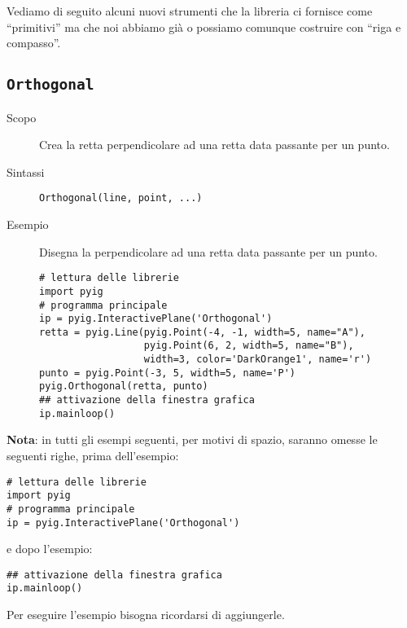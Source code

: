 

Vediamo di seguito alcuni nuovi strumenti che la libreria ci fornisce come 
``primitivi'' ma che noi abbiamo già o possiamo comunque costruire con 
``riga e compasso''.

\subsection{\lstinline{Orthogonal}}
\label{sub:geoint_orthogonal}

\begin{description}
 \item [Scopo] Crea la retta perpendicolare ad una retta data passante per un 
punto.
 \item [Sintassi] \lstinline{Orthogonal(line, point, ...)}
% 
% 

 \item [Esempio] Disegna la perpendicolare ad una retta data passante per un 
punto.

\begin{lstlisting}
# lettura delle librerie 
import pyig
# programma principale
ip = pyig.InteractivePlane('Orthogonal')
retta = pyig.Line(pyig.Point(-4, -1, width=5, name="A"), 
                  pyig.Point(6, 2, width=5, name="B"), 
                  width=3, color='DarkOrange1', name='r')
punto = pyig.Point(-3, 5, width=5, name='P')
pyig.Orthogonal(retta, punto)
## attivazione della finestra grafica
ip.mainloop()
\end{lstlisting}

\end{description}

\begin{exrig}
 
\textbf{Nota}: 
in tutti gli esempi seguenti, per motivi di spazio, saranno omesse 
le seguenti righe, prima dell'esempio:

\begin{lstlisting}
# lettura delle librerie 
import pyig
# programma principale
ip = pyig.InteractivePlane('Orthogonal')
\end{lstlisting}
e dopo l'esempio:
\begin{lstlisting}
## attivazione della finestra grafica
ip.mainloop()
\end{lstlisting}

Per eseguire l'esempio bisogna ricordarsi di aggiungerle.

\end{exrig}

